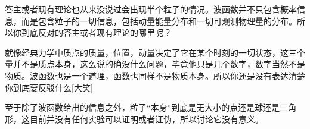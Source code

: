 \begin{itemize}
答主或者现有理论也从来没说过会出现半个粒子的情况。波函数并不只包含概率信息，而是包含粒子的一切信息，包括动量能量分布和一切可观测物理量的分布。所以你到底反对的答主或者现有理论的哪里呢？

就像经典力学中质点的质量，位置，动量决定了它在某个时刻的一切状态，这三个量并不是质点本身，这么说的确没什么问题，毕竟他只是几个数字，数字当然不是物质。波函数也是一个道理，函数也同样不是物质本身。所以你还是没有表达清楚你到底要反驳什么[大笑]

至于除了波函数给出的信息之外，粒子“本身”到底是无大小的点还是球还是三角形，这目前并没有任何实验可以证明或者证伪，所以讨论它没有意义。
\end{itemize}
